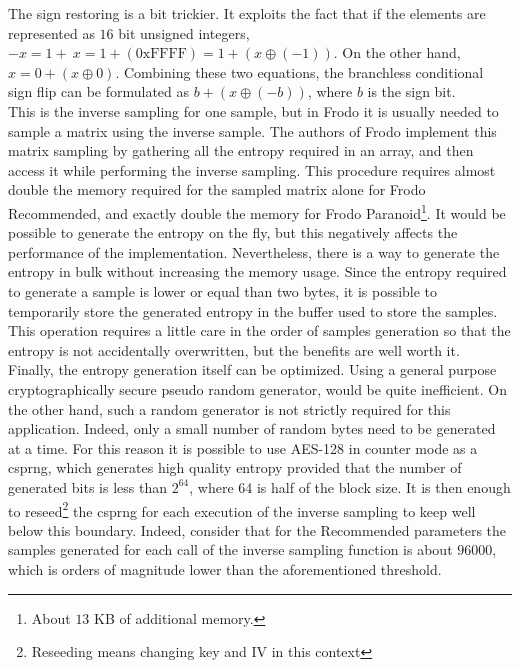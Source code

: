 The sign restoring is a bit trickier. It exploits the fact that if the elements are represented as $16$ bit unsigned integers, $-x=1+~x=1+(\text{0xFFFF})=1+(x\oplus(-1))$. On the other hand,$x=0+(x\oplus0)$. Combining these two equations, the branchless conditional sign flip can be formulated as $b+(x\oplus(-b))$, where $b$ is the sign bit.\\
This is the inverse sampling for one sample, but in Frodo it is usually needed to sample a matrix using the inverse sample. The authors of Frodo implement this matrix sampling by gathering all the entropy required in an array, and then access it while performing the inverse sampling. This procedure requires almost double the memory required for the sampled matrix alone for Frodo Recommended, and exactly double the memory for Frodo Paranoid\footnote{About $13$ KB of additional memory.}. It would be possible to generate the entropy on the fly, but this negatively affects the performance of the implementation. Nevertheless, there is a way to generate the entropy in bulk without increasing the memory usage. Since the entropy required to generate a sample is lower or equal than two bytes, it is possible to temporarily store the generated entropy in the buffer used to store the samples. This operation requires a little care in the order of samples generation so that the entropy is not accidentally overwritten, but the benefits are well worth it.\\
Finally, the entropy generation itself can be optimized. Using a general purpose cryptographically secure pseudo random generator, would be quite inefficient. On the other hand, such a random generator is not strictly required for this application. Indeed, only a small number of random bytes need to be generated at a time. For this reason it is possible to use AES-128 in counter mode as a csprng, which generates high quality entropy provided that the number of generated bits is less than $2^{64}$, where $64$ is half of the block size. It is then enough to reseed\footnote{Reseeding means changing key and IV in this context} the csprng for each execution of the inverse sampling to keep well below this boundary. Indeed, consider that for the Recommended parameters the samples generated for each call of the inverse sampling function is about $96000$, which is orders of magnitude lower than the aforementioned threshold. 

